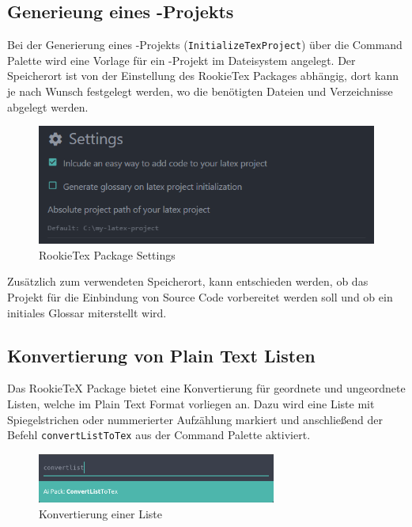         \subsection{Generieung eines \latex-Projekts}
            Bei der Generierung eines \latex-Projekts (\texttt{InitializeTexProject}) über die Command Palette wird eine Vorlage für ein \latex-Projekt im Dateisystem angelegt. Der Speicherort ist von der Einstellung des RookieTex Packages abhängig, dort kann je nach Wunsch festgelegt werden, wo die benötigten Dateien und Verzeichnisse abgelegt werden.
            \begin{figure}[H]
                \centering
                \includegraphics[width=\textwidth]{img/package_settings.png}
                \caption{RookieTex Package Settings}
            \end{figure}
            Zusätzlich zum verwendeten Speicherort, kann entschieden werden, ob das Projekt für die Einbindung von Source Code vorbereitet werden soll und ob ein initiales Glossar miterstellt wird.

        \subsection{Konvertierung von Plain Text Listen}
            Das RookieTeX Package bietet eine Konvertierung für geordnete und ungeordnete Listen, welche im Plain Text Format vorliegen an. Dazu wird eine Liste mit Spiegelstrichen oder nummerierter Aufzählung markiert und anschließend der Befehl \texttt{convertListToTex} aus der Command Palette aktiviert.
            \\[5mm]
            \begin{figure}[H]
                \centering
                \includegraphics[width=0.7\textwidth]{img/convert_list_cp.png}
                \caption{Konvertierung einer Liste}
            \end{figure}

